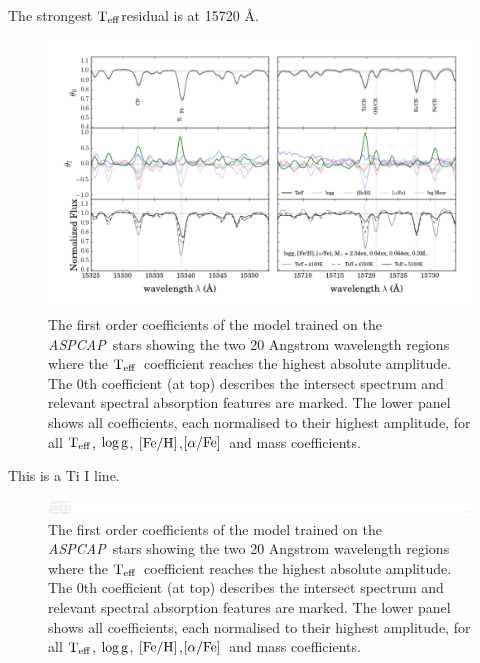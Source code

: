 \documentclass[12pt, preprint]{aastex}
\newcommand{\project}[1]{\textsl{#1}}
\newcommand{\aspcap}{\project{ASPCAP}}
\newcommand{\teff}{\mbox{$\rm T_{eff}$}}
\newcommand{\feh}{\mbox{$\rm [Fe/H]$}}
\newcommand{\alphafe}{\mbox{$\rm [\alpha/Fe]$}}
\newcommand{\logg}{\mbox{$\rm \log g$}}
\begin{document}
The strongest \teff residual is at 15720 \AA. 

\begin{figure}[p!]
\centering
    \includegraphics[scale=0.51]{./plots/coeffs_t_3.png}
  \caption{The first order coefficients of the model trained on the \aspcap\ stars showing the two 20 Angstrom wavelength regions where the \teff\ coefficient reaches the highest absolute amplitude. The 0th coefficient (at top) describes the intersect spectrum and relevant spectral absorption features are marked. The lower panel shows all coefficients, each normalised to their highest amplitude, for all \teff, \logg, \feh,\alphafe\ and mass coefficients.}
\label{fig:g}
\end{figure}

This is a Ti I line. \\

\begin{figure}[p!]
\centering
    \includegraphics[scale=0.51]{./plots/coeffs_af_3.png}
  \caption{The first order coefficients of the model trained on the \aspcap\ stars showing the two 20 Angstrom wavelength regions where the \teff\ coefficient reaches the highest absolute amplitude. The 0th coefficient (at top) describes the intersect spectrum and relevant spectral absorption features are marked. The lower panel shows all coefficients, each normalised to their highest amplitude, for all \teff, \logg, \feh,\alphafe\ and mass coefficients.}
\label{fig:g}
\end{figure}
\end{document}
